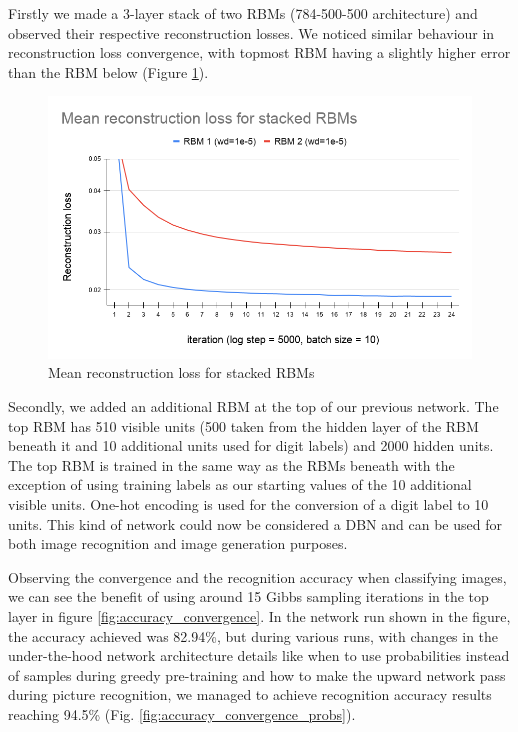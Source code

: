 \documentclass[a4paper]{article}
\begin{document}
Firstly we made a 3-layer stack of two RBMs (784-500-500 architecture) and observed their respective reconstruction losses. We noticed similar behaviour in reconstruction loss convergence, with topmost RBM having a slightly higher error than the RBM below (Figure \ref{fig:stacked_rbm_losses}).

\begin{figure}[H]
    \centering
    \includegraphics[width=.98\linewidth]{img/4.2 Mean reconstruction loss for stacked RBMs.png}
    \caption{Mean reconstruction loss for stacked RBMs}
    \label{fig:stacked_rbm_losses}
\end{figure}

Secondly, we added an additional RBM at the top of our previous network. The top RBM has 510 visible units (500 taken from the hidden layer of the RBM beneath it and 10 additional units used for digit labels) and 2000 hidden units. The top RBM is trained in the same way as the RBMs beneath with the exception of using training labels as our starting values of the 10 additional visible units. One-hot encoding is used for the conversion of a digit label to 10 units. This kind of network could now be considered a DBN and can be used for both image recognition and image generation purposes.

Observing the convergence and the recognition accuracy when classifying images, we can see the benefit of using around 15 Gibbs sampling iterations in the top layer in figure \ref{fig:accuracy_convergence}. In the network run shown in the figure, the accuracy achieved was 82.94\%, but during various runs, with changes in the under-the-hood network architecture details like when to use probabilities instead of samples during greedy pre-training and how to make the upward network pass during picture recognition, we managed to achieve recognition accuracy results reaching 94.5\% (Fig. \ref{fig:accuracy_convergence_probs}).
\end{document}
